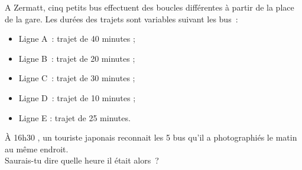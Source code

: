 \begin{exercice}
A Zermatt, cinq petits bus effectuent des boucles différentes à partir de la place de la gare. Les durées des trajets sont variables suivant les bus : \\[-1em]
\begin{itemize}
 \item Ligne A : trajet de 40 minutes ;
 \item Ligne B : trajet de 20 minutes ;
 \item Ligne C : trajet de 30 minutes ;
 \item Ligne D : trajet de 10 minutes ;
 \item Ligne E : trajet de 25 minutes.
 \end{itemize}
À 16h30 , un touriste japonais reconnait les 5 bus qu'il a photographiés le matin au même endroit. \\[0.5em]
Saurais-tu dire quelle heure il était alors ?
\end{exercice}